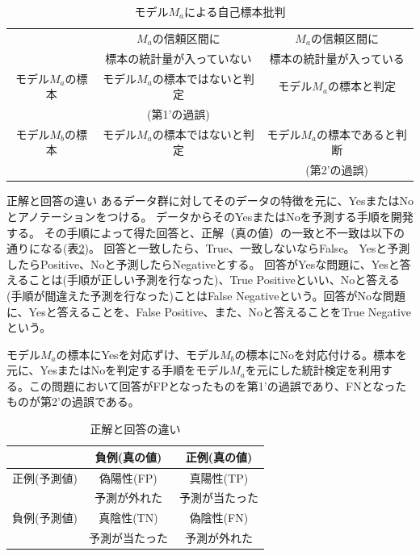 \begin{table}[hbtp]
    \caption{モデル$M_a$による自己標本批判}
    \label{table:type_error}
    \centering
    \begin{tabular}{ccc}
      \hline
        &  $M_a$の信頼区間に &  $M_a$の信頼区間に \\
        & 標本の統計量が入っていない & 標本の統計量が入っている \\
      \hline \hline
      モデル$M_a$の標本  & モデル$M_a$の標本ではないと判定  & モデル$M_a$の標本と判定 \\
      & (第1'の過誤) & \\
      モデル$M_b$の標本  & モデル$M_a$の標本ではないと判定   & モデル$M_a$の標本であると判断 \\
      & & (第2'の過誤) \\
      \hline
    \end{tabular}
  \end{table}


\begin{SMbox}{正解と回答の違い}
    あるデータ群に対してそのデータの特徴を元に、YesまたはNoとアノテーションをつける。
    データからそのYesまたはNoを予測する手順を開発する。
    その手順によって得た回答と、正解（真の値）の一致と不一致は以下の通りになる(表\ref{table:Yes_no_answer})。
    回答と一致したら、True、一致しないならFalse。
    Yesと予測したらPositive、Noと予測したらNegativeとする。
    回答がYesな問題に、Yesと答えることは(手順が正しい予測を行なった)、True Positiveといい、Noと答える(手順が間違えた予測を行なった)ことはFalse Negativeという。回答がNoな問題に、Yesと答えることを、False Positive、また、Noと答えることをTrue Negativeという。

    モデル$M_a$の標本にYesを対応ずけ、モデル$M_b$の標本にNoを対応付ける。標本を元に、YesまたはNoを判定する手順をモデル$M_a$を元にした統計検定を利用する。この問題において回答がFPとなったものを第1'の過誤であり、FNとなったものが第2'の過誤である。
    \end{SMbox}
    
    
    \begin{table}[hbtp]
    \caption{正解と回答の違い}
    \label{table:Yes_no_answer}
    \centering
    \begin{tabular}{ccc}
          &  負例(真の値) & 正例(真の値)  \\
        \hline \hline
        正例(予測値) &  偽陽性(FP)  & 真陽性(TP)\\
        &予測が外れた & 予測が当たった\\
        負例(予測値) & 真陰性(TN) & 偽陰性(FN)\\
        & 予測が当たった & 予測が外れた\\
        \hline
    \end{tabular}
    \end{table}

